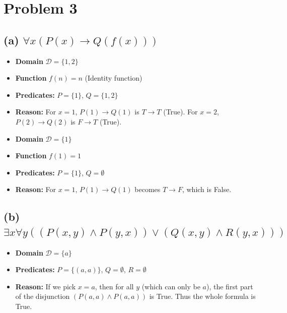 \documentclass[12pt]{article}
\begin{document}
\section*{Problem 3}

\subsection*{(a) $\forall x(P(x) \rightarrow Q(f(x)))$}

\begin{tcolorbox}[title=Model $\mathcal{M}_1$ (Satisfies the formula)]
    \begin{itemize}
        \item \textbf{Domain} $\mathcal{D} = \{1, 2\}$
        \item \textbf{Function} $f(n) = n$ (Identity function)
        \item \textbf{Predicates:} $P = \{1\}$, $Q = \{1, 2\}$
        \item \textbf{Reason:} For $x=1$, $P(1) \rightarrow Q(1)$ is $T \rightarrow T$ (True). For $x=2$, $P(2) \rightarrow Q(2)$ is $F \rightarrow T$ (True).
    \end{itemize}
\end{tcolorbox}

\begin{tcolorbox}[title=Model $\mathcal{M}_2$ (Does not satisfy)]
    \begin{itemize}
        \item \textbf{Domain} $\mathcal{D} = \{1\}$
        \item \textbf{Function} $f(1) = 1$
        \item \textbf{Predicates:} $P = \{1\}$, $Q = \emptyset$
        \item \textbf{Reason:} For $x=1$, $P(1) \rightarrow Q(1)$ becomes $T \rightarrow F$, which is False.
    \end{itemize}
\end{tcolorbox}

\subsection*{(b) $\exists x \forall y ((P(x,y) \wedge P(y,x)) \vee (Q(x,y) \wedge R(y,x)))$}

\begin{tcolorbox}[title=Model $\mathcal{M}_3$ (Satisfies the formula)]
    \begin{itemize}
        \item \textbf{Domain} $\mathcal{D} = \{a\}$
        \item \textbf{Predicates:} $P = \{(a,a)\}$, $Q = \emptyset$, $R = \emptyset$
        \item \textbf{Reason:} If we pick $x=a$, then for all $y$ (which can only be $a$), the first part of the disjunction $(P(a,a) \wedge P(a,a))$ is True. Thus the whole formula is True.
    \end{itemize}
\end{tcolorbox}
\end{document}
